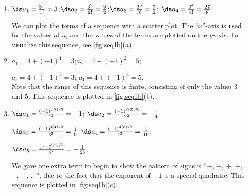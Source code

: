 {\begin{enumerate}
\item		$\ds a_1=\frac{3^1}{1!} = 3$;\qquad	$\ds a_2= \frac{3^2}{2!} = \frac92$;\qquad $\ds a_3 = \frac{3^3}{3!} = \frac92$; \qquad $\ds a_4 = \frac{3^4}{4!} = \frac{27}8$

We can plot the terms of a sequence with a scatter plot. The ``$x$''-axis is used for the values of $n$, and the values of the terms are plotted on the $y$-axis. To visualize this sequence, see \autoref{fig:seq1b}(a).

\item		$a_1= 4+(-1)^1 = 3$;\qquad $a_2 = 4+(-1)^2 = 5$; 

\noindent $a_3=4+(-1)^3 = 3$; \qquad $a_4 = 4+(-1)^4 = 5$.\\
Note that the range of this sequence is finite, consisting of only the values 3 and 5. This sequence is plotted in \autoref{fig:seq1b}(b).

\item		$\ds a_1= \frac{(-1)^{1(2)/2}}{1^2} = -1$; \qquad $\ds a_2 = \frac{(-1)^{2(3)/2}}{2^2} =-\frac14$

\noindent $\ds a_3 = \frac{(-1)^{3(4)/2}}{3^2} = \frac19$ \qquad $\ds a_4 = \frac{(-1)^{4(5)/2}}{4^2} = \frac1{16}$; 

\noindent $\ds a_5 = \frac{(-1)^{5(6)/2}}{5^2}=-\frac1{25}$.

\noindent We gave one extra term to begin to show the pattern of signs is ``$-$, $-$, $+$, $+$, $-$, $-$, $\ldots$'', due to the fact that the exponent of $-1$ is a special quadratic. This sequence is plotted in \autoref{fig:seq1b}(c).\eoehere
\end{enumerate}}

